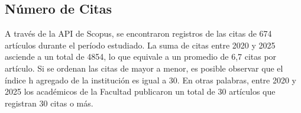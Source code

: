 \documentclass[
  spanish,
  a4paper,
  oneside]{scrbook}
\begin{document}
\begin{table}[H]

\caption{\label{tbl-index-carac}Publicaciones por Indexación y
características de los autores}


\end{table}%

\subsection{Número de Citas}\label{nuxfamero-de-citas}

A través de la API de Scopus, se encontraron registros de las citas de
674 artículos durante el período estudiado. La suma de citas entre 2020
y 2025 asciende a un total de 4854, lo que equivale a un promedio de 6,7
citas por artículo. Si se ordenan las citas de mayor a menor, es posible
observar que el índice h agregado de la institución es igual a 30. En
otras palabras, entre 2020 y 2025 los académicos de la Facultad
publicaron un total de 30 artículos que registran 30 citas o más.
\end{document}
